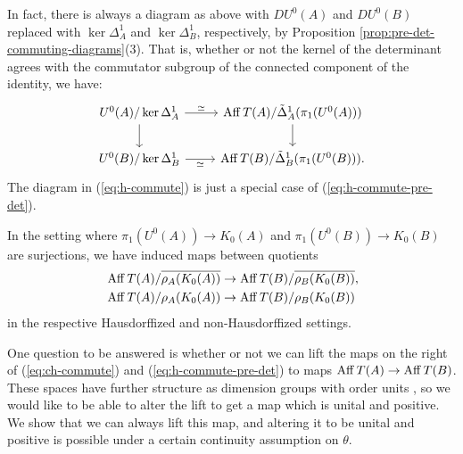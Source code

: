 \documentclass[12pt]{amsart}
\begin{document}
In fact, there is always a diagram as above with $DU^0(A)$ and $DU^0(B)$ replaced with $\ker\Delta_A^1$ and $\ker\Delta_B^1$, respectively, by Proposition \ref{prop:pre-det-commuting-diagrams}(3). That is, whether or not the kernel of the determinant agrees with the commutator subgroup of the connected component of the identity, we have:
\begin{equation}\label{eq:h-commute-pre-det}
\begin{tikzcd}
U^0(A)/\ker\Delta_A^1 \arrow[r, "\simeq"] \arrow[d] & \Aff T(A)/\tD_A^1(\pi_1(U^0(A))) \arrow[d] \\
U^0(B)/\ker\Delta_B^1 \arrow[r, "\simeq"']          & \Aff T(B)/\tD_B^1(\pi_1(U^0(B))).
\end{tikzcd}
\end{equation}
The diagram in (\ref{eq:h-commute}) is just a special case of (\ref{eq:h-commute-pre-det}).
 
 In the setting where $\pi_1(U^0(A)) \to K_0(A)$ and $\pi_1(U^0(B)) \to K_0(B)$ are surjections, we have induced maps between quotients
\begin{equation}
\begin{split}
&\operatorname{Aff} T(A)/\overline{\rho_A(K_0(A))} \to \operatorname{Aff} T(B)/\overline{\rho_B(K_0(B))}, \\
&\operatorname{Aff} T(A)/\rho_A(K_0(A)) \to \operatorname{Aff} T(B)/\rho_B(K_0(B))
\end{split}
\end{equation}
in the respective Hausdorffized and non-Hausdorffized settings. 

One question to be answered is whether or not we can lift the maps on the right of (\ref{eq:ch-commute}) and (\ref{eq:h-commute-pre-det}) to maps $\operatorname{Aff} T(A) \to \operatorname{Aff} T(B)$. These spaces have further structure as dimension groups with order units \cite[Chapter 7]{Goodearlbook}, so we would like to be able to alter the lift to get a map which is unital and positive. We show that we can always lift this map,  and altering it to be unital and positive is possible under a certain continuity assumption on $\theta$.
\end{document}
